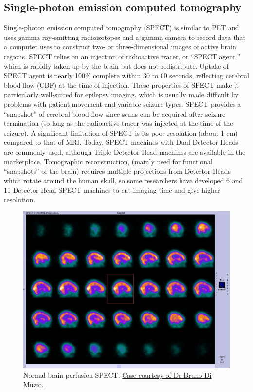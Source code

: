 \hypertarget{single-photon-emission-computed-tomography}{%
\subsection{Single-photon emission computed tomography}\label{single-photon-emission-computed-tomography}}

Single-photon emission computed tomography (SPECT) is similar to PET and uses gamma ray-emitting radioisotopes and a gamma camera to record data that a computer uses to construct two- or three-dimensional images of active brain regions. SPECT relies on an injection of radioactive tracer, or ``SPECT agent,'' which is rapidly taken up by the brain but does not redistribute. Uptake of SPECT agent is nearly 100\% complete within 30 to 60 seconds, reflecting cerebral blood flow (CBF) at the time of injection. These properties of SPECT make it particularly well-suited for epilepsy imaging, which is usually made difficult by problems with patient movement and variable seizure types. SPECT provides a ``snapshot'' of cerebral blood flow since scans can be acquired after seizure termination (so long as the radioactive tracer was injected at the time of the seizure). A significant limitation of SPECT is its poor resolution (about 1 cm) compared to that of MRI. Today, SPECT machines with Dual Detector Heads are commonly used, although Triple Detector Head machines are available in the marketplace. Tomographic reconstruction, (mainly used for functional ``snapshots'' of the brain) requires multiple projections from Detector Heads which rotate around the human skull, so some researchers have developed 6 and 11 Detector Head SPECT machines to cut imaging time and give higher resolution.



\begin{figure}

{\centering \includegraphics[width=0.7\linewidth]{./figures/nervoussystem/normal-brain-perfusion-spect} 

}

\caption{Normal brain perfusion SPECT. \href{https://radiopaedia.org/cases/30090}{Case courtesy of Dr Bruno Di Muzio.}}\label{fig:brainspect}
\end{figure}

